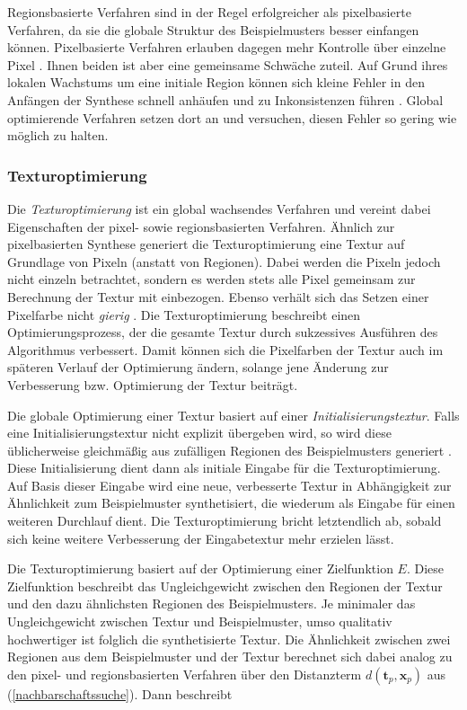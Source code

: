 Regionsbasierte Verfahren sind in der Regel erfolgreicher als pixelbasierte Verfahren, da sie die globale Struktur des Beispielmusters besser einfangen können.
Pixelbasierte Verfahren erlauben dagegen mehr Kontrolle über einzelne Pixel \cite{TextureOptimization}.
Ihnen beiden ist aber eine gemeinsame Schwäche zuteil.
Auf Grund ihres lokalen Wachstums um eine initiale Region können sich kleine Fehler in den Anfängen der Synthese schnell anhäufen und zu Inkonsistenzen führen \cite{TextureOptimization}.
Global optimierende Verfahren setzen dort an und versuchen, diesen Fehler so gering wie möglich zu halten.

\subsubsection{Texturoptimierung}
\label{chapter-texturoptimierung}

Die \emph{Texturoptimierung} ist ein global wachsendes Verfahren und vereint dabei Eigenschaften der pixel- sowie regionsbasierten Verfahren.
Ähnlich zur pixelbasierten Synthese generiert die Texturoptimierung eine Textur auf Grundlage von Pixeln (anstatt von Regionen).
Dabei werden die Pixeln jedoch nicht einzeln betrachtet, sondern es werden stets alle Pixel gemeinsam zur Berechnung der Textur mit einbezogen.
Ebenso verhält sich das Setzen einer Pixelfarbe nicht \emph{gierig} \cite{StateOfTheArt}.
Die Texturoptimierung beschreibt einen Optimierungsprozess, der die gesamte Textur durch sukzessives Ausführen des Algorithmus verbessert.
Damit können sich die Pixelfarben der Textur auch im späteren Verlauf der Optimierung ändern, solange jene Änderung zur Verbesserung bzw. Optimierung der Textur beiträgt.

Die globale Optimierung einer Textur basiert auf einer \emph{Initialisierungstextur}.
Falls eine Initialisierungstextur nicht explizit übergeben wird, so wird diese üb\-lich\-er\-wei\-se gleichmäßig aus zufälligen Regionen des Beispielmusters generiert \cite{TextureOptimization}.
Diese Initialisierung dient dann als initiale Eingabe für die Texturoptimierung.
Auf Basis dieser Eingabe wird eine neue, verbesserte Textur in Abhängigkeit zur Ähnlichkeit zum Beispielmuster synthetisiert, die wiederum als Eingabe für einen weiteren Durchlauf dient.
Die Texturoptimierung bricht letztendlich ab, sobald sich keine weitere Verbesserung der Eingabetextur mehr erzielen lässt.

Die Texturoptimierung basiert auf der Optimierung einer Zielfunktion $E$.
Diese Zielfunktion beschreibt das Ungleichgewicht zwischen den Regionen der Textur und den dazu ähnlichsten Regionen des Beispielmusters.
Je minimaler das Ungleichgewicht zwischen Textur und Beispielmuster, umso qualitativ hochwertiger ist folglich die synthetisierte Textur.
Die Ähnlichkeit zwischen zwei Regionen aus dem Beispielmuster und der Textur berechnet sich dabei analog zu den pixel- und regionsbasierten Verfahren über den Distanzterm $d(\textbf{t}_p, \textbf{x}_p)$ aus (\ref{nachbarschaftssuche}).
Dann beschreibt

